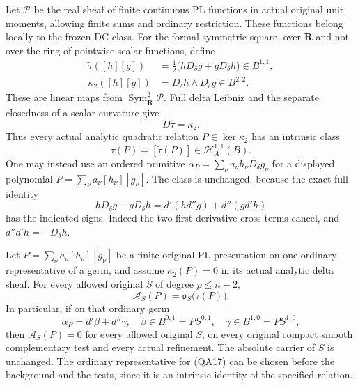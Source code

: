 Let $\mathscr P$ be the real sheaf of finite continuous PL functions
in actual original unit moments, allowing finite sums and ordinary
restriction.  These functions belong locally to the frozen DC
class.  For the formal symmetric square, over $\mathbf R$ and not
over the ring of pointwise scalar functions, define
\[
 \begin{split}
 \widetilde\tau([h][g])
       &=\tfrac12\bigl(hD_\delta g+gD_\delta h\bigr)
                                                    \in B^{1,1},\\
 \kappa_2([h][g])&=D_\delta h\wedge D_\delta g
                                                    \in B^{2,2}.
 \end{split}                                           \tag{QA12}
\]
These are linear maps from $\operatorname{Sym}^2_{\mathbf R}
\mathscr P$.  Full delta Leibniz and the separate closedness of a
scalar curvature give
\[
                         D\widetilde\tau=\kappa_2.      \tag{QA13}
\]
Thus every actual analytic quadratic relation $P\in\ker\kappa_2$
has an intrinsic class
\[
                   \tau(P)=[\widetilde\tau(P)]
                                   \in\mathcal H_A^{1,1}(B).
                                                        \tag{QA14}
\]
One may instead use an ordered primitive $\alpha_P=\sum_\nu
a_\nu h_\nu D_\delta g_\nu$ for a displayed polynomial
$P=\sum_\nu a_\nu[h_\nu][g_\nu]$.  The class is unchanged,
because the exact full identity
\[
 hD_\delta g-gD_\delta h
       =d'(h d''g)+d''(g d'h)                           \tag{QA15}
\]
has the indicated signs.  Indeed the two first-derivative cross
terms cancel, and $d''d'h=-D_\delta h$.

\begin{theorem}
Let $P=\sum_\nu a_\nu[h_\nu][g_\nu]$ be a finite original
PL presentation on one ordinary representative of a germ, and
assume $\kappa_2(P)=0$ in its actual analytic delta sheaf.
For every allowed original $S$ of degree $p\le n-2$,
\[
          \mathcal A_S(P)=\mathfrak o_S\bigl(\tau(P)\bigr).
                                                        \tag{QA16}
\]
In particular, if on that ordinary germ
\[
           \alpha_P=d'\beta+d''\gamma,
       \quad \beta\in B^{0,1}=PS^{0,1},\quad
             \gamma\in B^{1,0}=PS^{1,0},                \tag{QA17}
\]
then $\mathcal A_S(P)=0$ for every allowed original $S$, on
every original compact smooth complementary test and every actual
refinement.  The absolute carrier of $S$ is unchanged.
The ordinary representative for (QA17) can be chosen before
the background and the tests, since it is an intrinsic identity
of the specified relation.
\end{theorem}


